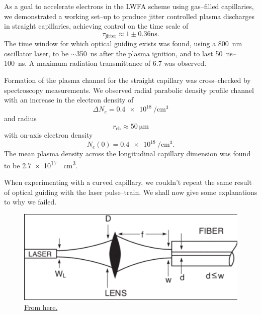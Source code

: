 \documentclass[../main.tex]{subfiles}
\begin{document}
As a goal to accelerate electrons in the LWFA scheme using gas--filled capillaries, we demonstrated a working set--up to produce jitter controlled plasma discharges in straight capillaries, achieving control on the time scale of
\begin{equation*}
    	\tau_\text{jitter}\approx 1\pm 0.36\si{\ns}.
\end{equation*}
The time window for which optical guiding exists was found, using a \SI{800}{\nm} oscillator laser, to be $\sim$\SI{350}{\ns} after the plasma ignition, and to last \SIrange{50}{100}{\ns}. A maximum radiation transmittance of 6.7 was observed.

Formation of the plasma channel for the straight capillary was cross--checked by spectroscopy measurements. We observed radial parabolic density profile channel with an increase in the electron density of $$\Delta N_e =\SI{0.4e18}{\per\cubic\cm}$$ and radius
$$r_\text{ch}\approx \SI{50}{\um}$$ with on-axis electron density $$N_e(0)=\SI{0.4e18}{\per\cubic\cm}.$$
The mean plasma density across the longitudinal capillary dimension was found to be \SI{2.7e17}{\per\cubic\cm}.

When experimenting with a curved capillary, we couldn't repeat the same result of optical guiding with the laser pulse--train. We shall now give some explanations to why we failed.

\begin{figure}
    \centering
    \includegraphics[width=\textwidth]{figures/Curved capillaries/coupling light to fiber.PNG}
    \caption{\href{https://www.newport.com/t/fiber-optic-basics}{From here.}}
    \label{fig:fiber}
\end{figure}
\end{document}
